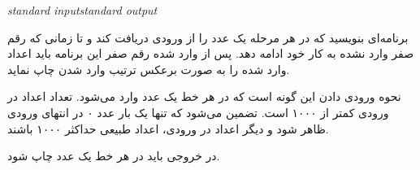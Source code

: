 \begin{problem}{}
{\textsl{standard input}}{\textsl{standard output}}
{}{}{}

برنامه‌ای بنویسید که در هر مرحله یک عدد را از ورودی دریافت کند و تا زمانی که رقم صفر وارد نشده به کار خود ادامه دهد. پس از وارد شده رقم صفر این برنامه باید اعداد وارد شده را به صورت برعکس ترتیب وارد شدن چاپ نماید.

\InputFile
نحوه ورودی دادن این گونه است که در هر خط یک عدد وارد می‌شود. تعداد اعداد در ورودی کمتر از ۱۰۰۰ است. تضمین می‌شود که تنها یک بار عدد ۰ در انتهای ورودی ظاهر شود و دیگر اعداد در ورودی، اعداد طبیعی حداکثر ۱۰۰۰ باشند.

\OutputFile

در خروجی باید در هر خط یک عدد چاپ شود.

\Examples

\begin{example}
%
\end{example}


\end{problem}
